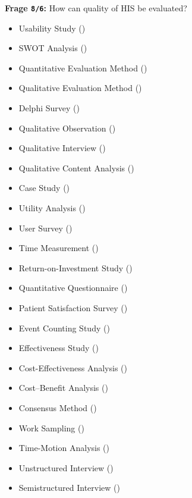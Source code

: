 \textbf{Frage \texttt{8/6}:} How can quality of HIS be evaluated?

\begin{itemize}
  \item Usability Study ()
  \item SWOT Analysis ()
  \item Quantitative Evaluation Method ()
  \item Qualitative Evaluation Method ()
  \item Delphi Survey ()
  \item Qualitative Observation ()
  \item Qualitative Interview ()
  \item Qualitative Content Analysis ()
  \item Case Study ()
  \item Utility Analysis ()
  \item User Survey ()
  \item Time Measurement ()
  \item Return-on-Investment Study ()
  \item Quantitative Questionnaire ()
  \item Patient Satisfaction Survey ()
  \item Event Counting Study ()
  \item Effectiveness Study ()
  \item Cost-Effectiveness Analysis ()
  \item Cost–Benefit Analysis ()
  \item Consensus Method ()
  \item Work Sampling ()
  \item Time-Motion Analysis ()
  \item Unstructured Interview ()
  \item Semistructured Interview ()
\end{itemize}

